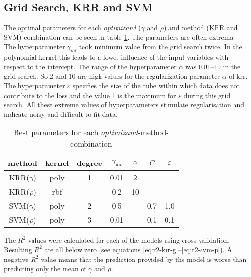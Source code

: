%


\subsection{Grid Search, KRR and SVM}
The optimal parameters for each \textit{optimizand} ($\gamma$ and $\rho$) and method (KRR and SVM) 
combination can be seen in table \ref{tab:grid-search}. 
The parameters are often extrema.
The hyperparameter $\gamma_{ml}$ took minimum value from the grid search twice. 
In the polynomial kernel this leads to a lower influence of the input variables with respect to the intercept. 
The range of the hyperparameter $\alpha$ was 0.01--10 in the grid search. 
So 2 and 10 are high values for the regularization parameter $\alpha$ of \gls{krr}.
The hyperparameter $\varepsilon$ specifies the size of the tube within which data does not contribute to the loss 
and the value 1 is the maximum for $\varepsilon$ during this grid search. 
All these extreme values of hyperparameters stimulate regularisation and indicate noisy and difficult to fit data.
\begin{table}
    \center
    \begin{tabular}{ccccccc}
        \hline\hline
        method  &kernel &degree &$\gamma_{ml}$   &$\alpha$    &$C$    &$\varepsilon$\\
        \hline
        KRR($\gamma$)   &poly   &1  &0.01   &2 &-&-\\
        KRR($\rho  $)   &rbf    &-   &0.2   &10&-&-\\
        SVM($\gamma$)   &poly   &2  &0.5    &-&0.7  &1.0  \\
        SVM($\rho  $)   &poly   &3  &0.01   &-&0.1  &0.1  \\
        \hline\hline
    \end{tabular}
    \caption{Best parameters for each \textit{optimizand}-method-combination}
    \label{tab:grid-search}
\end{table}
The $R^2$ values were calculated for each of the models using cross validation. 
Resulting $R^2$ are all below zero (see equations \ref{eq:r2-krr-g}--\ref{eq:r2-svm-p}). 
A negative $R^2$ value means that the prediction provided by the model is worse than predicting only the mean of $\gamma$ and $\rho$. 


